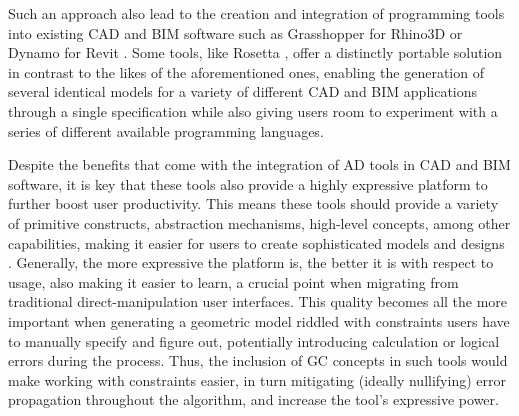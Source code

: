 Such an approach also lead to the creation and integration of programming tools
into existing \ac{CAD} and \ac{BIM} software such as Grasshopper
\cite{Rutten:2018:Grasshopper} for Rhino3D \cite{McNeel:2018:Rhinoceros3D} or
Dynamo \cite{Keough:2012:Dynamo} for Revit \cite{RevitTechCorp:2002:Revit}.
Some tools, like Rosetta \cite{Leitao:2011:PGDCAD}, offer a distinctly portable
solution in contrast to the likes of the aforementioned ones, enabling the
generation of several identical models for a variety of different \ac{CAD} and
\ac{BIM} applications through a single specification
\cite{CasteloBranco:2017:IAD} while also giving users room to experiment with a
series of different available programming languages.

Despite the benefits that come with the integration of \ac{AD} tools in \ac{CAD}
and \ac{BIM} software, it is key that these tools also provide a highly
expressive platform to further boost user productivity.  This means these tools
should provide a variety of primitive constructs, abstraction mechanisms,
high-level concepts, among other capabilities, making it easier for users to
create sophisticated models and designs \cite{Leitao:2014:IGDAGHOP}.  Generally,
the more expressive the platform is, the better it is with respect to usage,
also making it easier to learn, a crucial point when migrating from traditional
direct-manipulation user interfaces.  This quality becomes all the more
important when generating a geometric model riddled with constraints users have
to manually specify and figure out, potentially introducing calculation or
logical errors during the process.  Thus, the inclusion of \ac{GC} concepts in
such tools would make working with constraints easier, in turn mitigating
(ideally nullifying) error propagation throughout the algorithm, and increase
the tool's expressive power.

